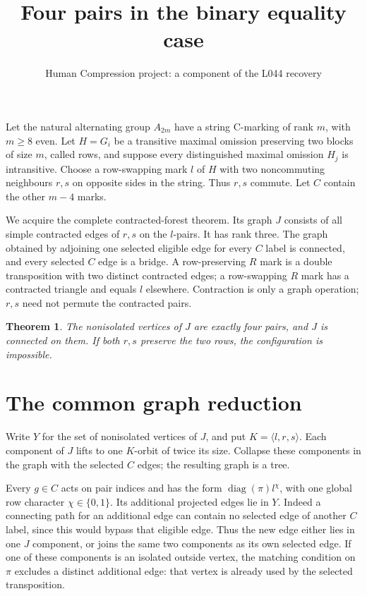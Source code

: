 \documentclass[11pt,a4paper]{article}
\title{Four pairs in the binary equality case}
\author{Human Compression project: a component of the L044 recovery}
\date{}
\newtheorem{theorem}[lemma]{Theorem}
\newcommand{\gen}[1]{\langle#1\rangle}
\newcommand{\diag}{\operatorname{diag}}
\begin{document}
\maketitle

Let the natural alternating group $A_{2m}$ have a string C-marking
of rank $m$, with $m\ge8$ even. Let $H=G_i$ be a transitive
maximal omission preserving two blocks of size $m$, called rows,
and suppose every distinguished maximal omission $H_j$ is
intransitive. Choose a row-swapping mark $l$ of $H$ with two
noncommuting neighbours $r,s$ on opposite sides in the string.
Thus $r,s$ commute. Let $C$ contain the other $m-4$ marks.

We acquire the complete contracted-forest theorem. Its graph $J$
consists of all simple contracted edges of $r,s$ on the $l$-pairs.
It has rank three. The graph obtained by adjoining one selected
eligible edge for every $C$ label is connected, and every selected
$C$ edge is a bridge. A row-preserving $R$ mark is a double
transposition with two distinct contracted edges; a row-swapping
$R$ mark has a contracted triangle and equals $l$ elsewhere.
Contraction is only a graph operation; $r,s$ need not permute
the contracted pairs.

\begin{theorem}\label{main}
The nonisolated vertices of $J$ are exactly four pairs, and $J$
is connected on them. If both $r,s$ preserve the two rows, the
configuration is impossible.
\end{theorem}

\section*{The common graph reduction}
Write $Y$ for the set of nonisolated vertices of $J$, and put
$K=\gen{l,r,s}$. Each component of $J$ lifts to one $K$-orbit
of twice its size. Collapse these components in the graph with
the selected $C$ edges; the resulting graph is a tree.

Every $g\in C$ acts on pair indices and has the form
$\diag(\pi)l^\chi$, with one global row character
$\chi\in\{0,1\}$. Its additional projected edges lie in $Y$.
Indeed a connecting path for an additional edge can contain no
selected edge of another $C$ label, since this would bypass that
eligible edge. Thus the new edge either lies in one $J$ component,
or joins the same two components as its own selected edge. If
one of these components is an isolated outside vertex, the matching
condition on $\pi$ excludes a distinct additional edge: that
vertex is already used by the selected transposition.
\end{document}
